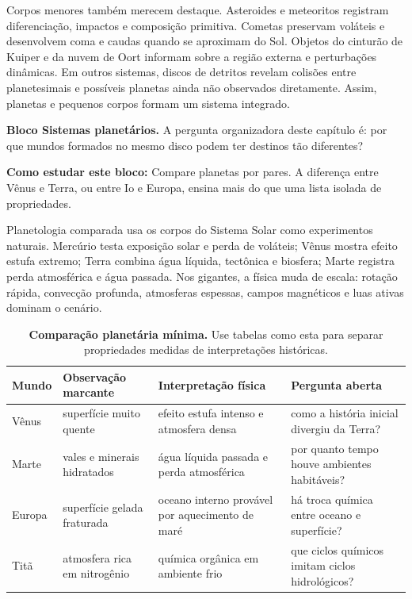 \documentclass[11pt,a4paper]{article}
\newcommand{\aberturabloco}[3]{%
  \begin{noticebox}
  \textbf{Bloco #1.} #2

  \textbf{Como estudar este bloco:} #3
  \end{noticebox}
}
\begin{document}
Corpos menores também merecem destaque. Asteroides e meteoritos registram diferenciação, impactos e composição primitiva. Cometas preservam voláteis e desenvolvem coma e caudas quando se aproximam do Sol. Objetos do cinturão de Kuiper e da nuvem de Oort informam sobre a região externa e perturbações dinâmicas. Em outros sistemas, discos de detritos revelam colisões entre planetesimais e possíveis planetas ainda não observados diretamente. Assim, planetas e pequenos corpos formam um sistema integrado.

\aberturabloco{Sistemas planetários}{A pergunta organizadora deste capítulo é: por que mundos formados no mesmo disco podem ter destinos tão diferentes?}{Compare planetas por pares. A diferença entre Vênus e Terra, ou entre Io e Europa, ensina mais do que uma lista isolada de propriedades.}

Planetologia comparada usa os corpos do Sistema Solar como experimentos naturais. Mercúrio testa exposição solar e perda de voláteis; Vênus mostra efeito estufa extremo; Terra combina água líquida, tectônica e biosfera; Marte registra perda atmosférica e água passada. Nos gigantes, a física muda de escala: rotação rápida, convecção profunda, atmosferas espessas, campos magnéticos e luas ativas dominam o cenário.

\begin{longtable}{>{\raggedright\arraybackslash}p{2.6cm}>{\raggedright\arraybackslash}p{3.2cm}>{\raggedright\arraybackslash}p{4.2cm}>{\raggedright\arraybackslash}p{4cm}}
\caption{\textbf{Comparação planetária mínima.} Use tabelas como esta para separar propriedades medidas de interpretações históricas.}\\
\toprule
Mundo & Observação marcante & Interpretação física & Pergunta aberta \\
\midrule
Vênus & superfície muito quente & efeito estufa intenso e atmosfera densa & como a história inicial divergiu da Terra? \\
Marte & vales e minerais hidratados & água líquida passada e perda atmosférica & por quanto tempo houve ambientes habitáveis? \\
Europa & superfície gelada fraturada & oceano interno provável por aquecimento de maré & há troca química entre oceano e superfície? \\
Titã & atmosfera rica em nitrogênio & química orgânica em ambiente frio & que ciclos químicos imitam ciclos hidrológicos? \\
\bottomrule
\end{longtable}
\end{document}
